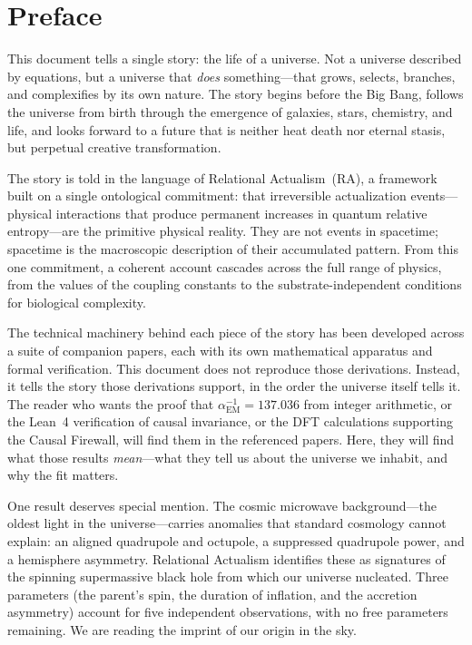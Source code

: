 \documentclass[11pt,a4paper]{article}
\theoremstyle{plain}
\theoremstyle{definition}
\theoremstyle{remark}
\begin{document}
\section*{Preface}\label{sec:preface}

This document tells a single story: the life of a universe.  Not a
universe described by equations, but a universe that \emph{does}
something---that grows, selects, branches, and complexifies by its own
nature.  The story begins before the Big Bang, follows the universe from
birth through the emergence of galaxies, stars, chemistry, and life, and
looks forward to a future that is neither heat death nor eternal stasis,
but perpetual creative transformation.

The story is told in the language of Relational Actualism~(RA), a
framework built on a single ontological commitment: that irreversible
actualization events---physical interactions that produce permanent
increases in quantum relative entropy---are the primitive physical
reality.  They are not events in spacetime; spacetime is the macroscopic
description of their accumulated pattern.  From this one commitment, a
coherent account cascades across the full range of physics, from the
values of the coupling constants to the substrate-independent conditions
for biological complexity.

The technical machinery behind each piece of the story has been developed
across a suite of companion papers, each with its own mathematical
apparatus and formal verification.  This document does not reproduce those
derivations.  Instead, it tells the story those derivations support, in
the order the universe itself tells it.  The reader who wants the proof
that $\alpha_{\mathrm{EM}}^{-1} = 137.036$ from integer arithmetic, or
the Lean~4 verification of causal invariance, or the DFT calculations
supporting the Causal Firewall, will find them in the referenced papers.
Here, they will find what those results \emph{mean}---what they tell us
about the universe we inhabit, and why the fit matters.

One result deserves special mention.  The cosmic microwave
background---the oldest light in the universe---carries anomalies that
standard cosmology cannot explain: an aligned quadrupole and octupole,
a suppressed quadrupole power, and a hemisphere asymmetry.  Relational
Actualism identifies these as signatures of the spinning supermassive
black hole from which our universe nucleated.  Three parameters (the
parent's spin, the duration of inflation, and the accretion asymmetry)
account for five independent observations, with no free parameters
remaining.  We are reading the imprint of our origin in the sky.
\end{document}
